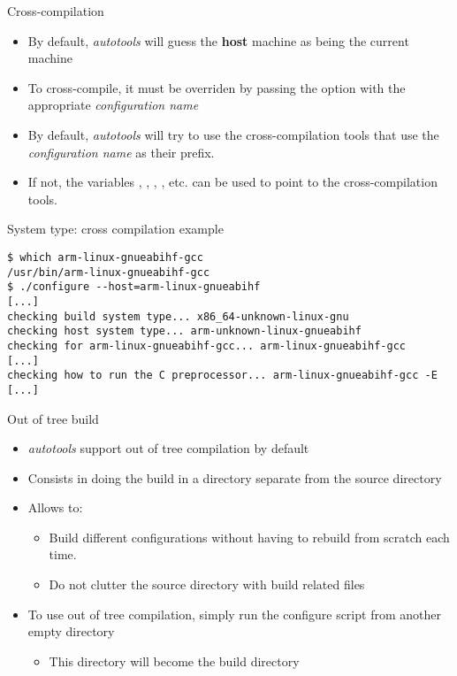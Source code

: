 \begin{frame}{Cross-compilation}
  \begin{itemize}
  \item By default, {\em autotools} will guess the {\bf host} machine
    as being the current machine
  \item To cross-compile, it must be overriden by passing the
     option with the appropriate {\em configuration name}
  \item By default, {\em autotools} will try to use the
    cross-compilation tools that use the {\em configuration name} as
    their prefix.
  \item If not, the variables , , ,
    , etc. can be used to point to the cross-compilation
    tools.
  \end{itemize}
\end{frame}

\begin{frame}[fragile]{System type: cross compilation example}

\begin{block}{}
{\scriptsize
\begin{verbatim}
$ which arm-linux-gnueabihf-gcc
/usr/bin/arm-linux-gnueabihf-gcc
$ ./configure --host=arm-linux-gnueabihf
[...]
checking build system type... x86_64-unknown-linux-gnu
checking host system type... arm-unknown-linux-gnueabihf
checking for arm-linux-gnueabihf-gcc... arm-linux-gnueabihf-gcc
[...]
checking how to run the C preprocessor... arm-linux-gnueabihf-gcc -E
[...]
\end{verbatim}}
\end{block}

\end{frame}

\begin{frame}{Out of tree build}
  \begin{itemize}
  \item {\em autotools} support out of tree compilation by default
  \item Consists in doing the build in a directory separate from the
    source directory
  \item Allows to:
    \begin{itemize}
    \item Build different configurations without having to rebuild
      from scratch each time.
    \item Do not clutter the source directory with build related files
    \end{itemize}
  \item To use out of tree compilation, simply run the configure
    script from another empty directory
    \begin{itemize}
    \item This directory will become the build directory
    \end{itemize}
  \end{itemize}
\end{frame}

